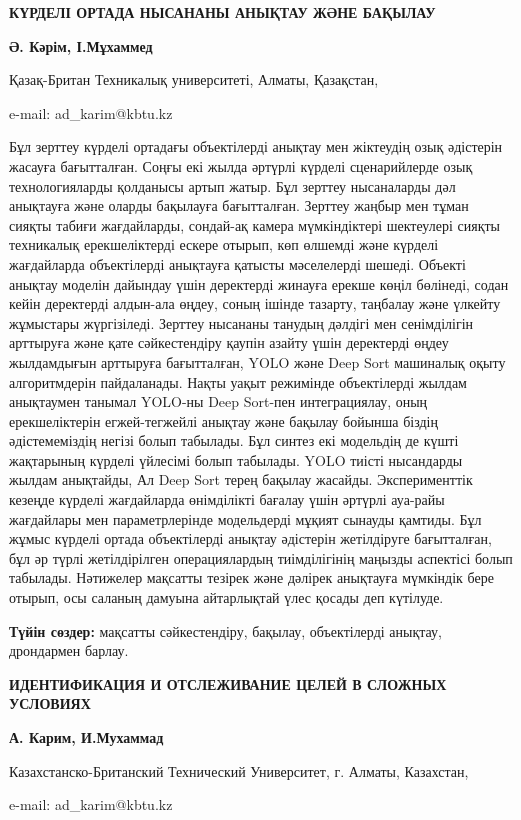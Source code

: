 \begin{center}
{\large\bfseries КҮРДЕЛІ ОРТАДА НЫСАНАНЫ АНЫҚТАУ ЖӘНЕ БАҚЫЛАУ}

{\bfseries Ә. Кәрім\envelope, І.Мұхаммед}

Қазақ-Британ Техникалық университеті, Алматы, Қазақстан,

e-mail: ad\_karim@kbtu.kz
\end{center}

Бұл зерттеу күрделі ортадағы объектілерді анықтау мен жіктеудің озық
әдістерін жасауға бағытталған. Соңғы екі жылда әртүрлі күрделі
сценарийлерде озық технологияларды қолданысы артып жатыр. Бұл зерттеу
нысаналарды дәл анықтауға және оларды бақылауға бағытталған. Зерттеу
жаңбыр мен тұман сияқты табиғи жағдайларды, сондай-ақ камера
мүмкіндіктері шектеулері сияқты техникалық ерекшеліктерді ескере отырып,
көп өлшемді және күрделі жағдайларда объектілерді анықтауға қатысты
мәселелерді шешеді. Объекті анықтау моделін дайындау үшін деректерді
жинауға ерекше көңіл бөлінеді, содан кейін деректерді алдын-ала өңдеу,
соның ішінде тазарту, таңбалау және үлкейту жұмыстары жүргізіледі.
Зерттеу нысананы танудың дәлдігі мен сенімділігін арттыруға және қате
сәйкестендіру қаупін азайту үшін деректерді өңдеу жылдамдығын арттыруға
бағытталған, YOLO және Deep Sort машиналық оқыту алгоритмдерін
пайдаланады. Нақты уақыт режимінде объектілерді жылдам анықтаумен
танымал YOLO-ны Deep Sort-пен интеграциялау, оның ерекшеліктерін
егжей-тегжейлі анықтау және бақылау бойынша біздің әдістемеміздің негізі
болып табылады. Бұл синтез екі модельдің де күшті жақтарының күрделі
үйлесімі болып табылады. YOLO тиісті нысандарды жылдам анықтайды, Ал
Deep Sort терең бақылау жасайды. Эксперименттік кезеңде күрделі
жағдайларда өнімділікті бағалау үшін әртүрлі ауа-райы жағдайлары мен
параметрлерінде модельдерді мұқият сынауды қамтиды. Бұл жұмыс күрделі
ортада объектілерді анықтау әдістерін жетілдіруге бағытталған, бұл әр
түрлі жетілдірілген операциялардың тиімділігінің маңызды аспектісі болып
табылады. Нәтижелер мақсатты тезірек және дәлірек анықтауға мүмкіндік
бере отырып, осы саланың дамуына айтарлықтай үлес қосады деп күтілуде.

{\bfseries Түйін сөздер:} мақсатты сәйкестендіру, бақылау, объектілерді
анықтау, дрондармен барлау.

\begin{center}
{\large\bfseries ИДЕНТИФИКАЦИЯ И ОТСЛЕЖИВАНИЕ ЦЕЛЕЙ В СЛОЖНЫХ УСЛОВИЯХ}

{\bfseries А. Карим\envelope, И.Мухаммад}

Казахстанско-Британский Технический Университет, г. Алматы, Казахстан,

e-mail: ad\_karim@kbtu.kz
\end{center}

